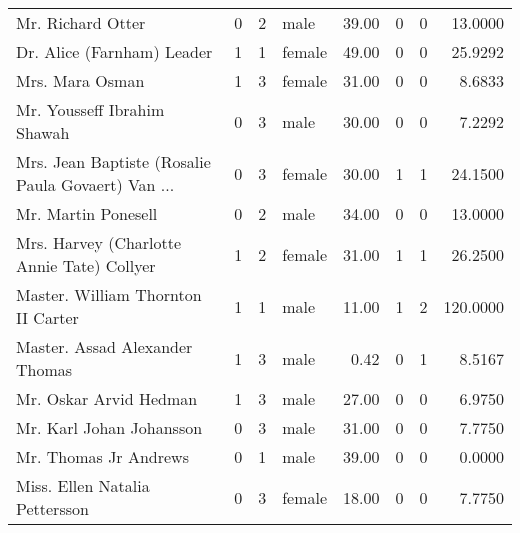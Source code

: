 \begin{tabular}{lrrlrrrr}
Mr. Richard Otter                                  &         0 &       2 &    male &  39.00 &                        0 &                        0 &   13.0000 \\
Dr. Alice (Farnham) Leader                         &         1 &       1 &  female &  49.00 &                        0 &                        0 &   25.9292 \\
Mrs. Mara Osman                                    &         1 &       3 &  female &  31.00 &                        0 &                        0 &    8.6833 \\
Mr. Yousseff Ibrahim Shawah                        &         0 &       3 &    male &  30.00 &                        0 &                        0 &    7.2292 \\
Mrs. Jean Baptiste (Rosalie Paula Govaert) Van ... &         0 &       3 &  female &  30.00 &                        1 &                        1 &   24.1500 \\
Mr. Martin Ponesell                                &         0 &       2 &    male &  34.00 &                        0 &                        0 &   13.0000 \\
Mrs. Harvey (Charlotte Annie Tate) Collyer         &         1 &       2 &  female &  31.00 &                        1 &                        1 &   26.2500 \\
Master. William Thornton II Carter                 &         1 &       1 &    male &  11.00 &                        1 &                        2 &  120.0000 \\
Master. Assad Alexander Thomas                     &         1 &       3 &    male &   0.42 &                        0 &                        1 &    8.5167 \\
Mr. Oskar Arvid Hedman                             &         1 &       3 &    male &  27.00 &                        0 &                        0 &    6.9750 \\
Mr. Karl Johan Johansson                           &         0 &       3 &    male &  31.00 &                        0 &                        0 &    7.7750 \\
Mr. Thomas Jr Andrews                              &         0 &       1 &    male &  39.00 &                        0 &                        0 &    0.0000 \\
Miss. Ellen Natalia Pettersson                     &         0 &       3 &  female &  18.00 &                        0 &                        0 &    7.7750 \\

\end{tabular}
